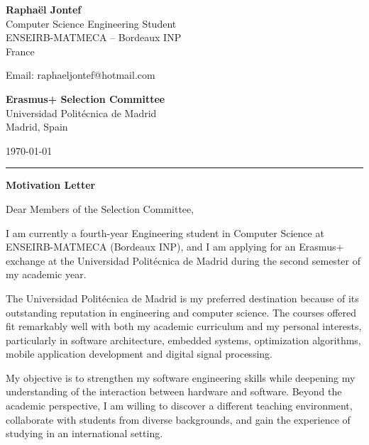 \documentclass[11pt,a4paper]{letter}
\begin{document}


\vspace{0.5cm}

\noindent
\begin{minipage}[t]{0.48\textwidth}
\textbf{\Large Raphaël Jontef}\\
Computer Science Engineering Student\\
ENSEIRB-MATMECA -- Bordeaux INP\\
France\\
\vspace{0.1cm}

Email: raphaeljontef@hotmail.com
\end{minipage}
\hfill
\begin{minipage}[t]{0.45\textwidth}
\raggedleft
\textbf{Erasmus+ Selection Committee}\\
Universidad Politécnica de Madrid\\
Madrid, Spain\\
\vspace{0.3cm}

\today
\end{minipage}

\vspace{0.4cm}
{\color{upmblue}\rule{\textwidth}{1pt}}
\vspace{0.4cm}

{\Large\bfseries Motivation Letter}

\vspace{0.6cm}

Dear Members of the Selection Committee,

\vspace{0.4cm}

I am currently a fourth-year Engineering student in Computer Science at
ENSEIRB-MATMECA (Bordeaux INP), and I am applying for an Erasmus+
exchange at the Universidad Politécnica de Madrid during the second
semester of my academic year.

The Universidad Politécnica de Madrid is my preferred destination
because of its outstanding reputation in engineering and computer
science. The courses offered fit remarkably well with both my academic
curriculum and my personal interests, particularly in software
architecture, embedded systems, optimization algorithms, mobile
application development and digital signal processing.

My objective is to strengthen my software engineering skills while
deepening my understanding of the interaction between hardware and
software. Beyond the academic perspective, I am willing to discover a
different teaching environment, collaborate with students from diverse
backgrounds, and gain the experience of studying in an international
setting.
\end{document}
